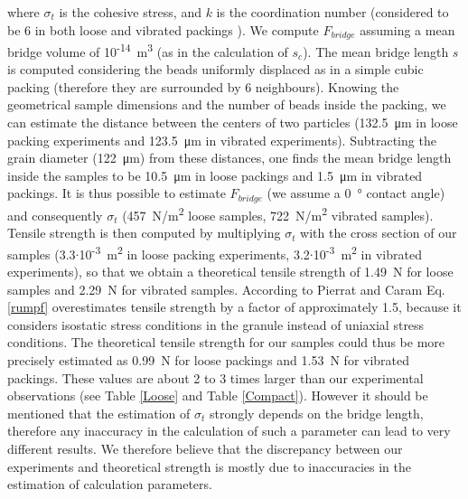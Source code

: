 where $\sigma_t$ is the cohesive stress, and $k$ is the coordination number (considered to be 6 in both loose and vibrated packings \cite{Kohonen2004}). We compute $F_{bridge}$ assuming a mean bridge volume of 10\textsuperscript{-14}~\si{m^3} (as in the calculation of $s_c$). The mean bridge length $s$ is computed considering the beads uniformly displaced as in a simple cubic packing (therefore they are surrounded by 6 neighbours). Knowing the geometrical sample dimensions and the number of beads inside the packing, we can estimate the distance between the centers of two particles (132.5~\si{\micro\metre} in loose packing experiments and 123.5~\si{\micro\metre} in vibrated experiments). Subtracting the grain diameter (122~\si{\micro\metre}) from these distances, one finds the mean bridge length inside the samples to be 10.5~\si{\micro\metre} in loose packings and 1.5~\si{\micro\metre} in vibrated packings. It is thus possible to estimate $F_{bridge}$ (we assume a 0~\si{\degree} contact angle) and consequently $\sigma_t$ (457~\si{N/m^2} loose samples, 722~\si{N/m^2} vibrated samples). Tensile strength is then computed by multiplying $\sigma_t$ with the cross section of our samples (3.3$\cdot$10\textsuperscript{-3}~\si{m^2} in loose packing experiments, 3.2$\cdot$10\textsuperscript{-3}~\si{m^2} in vibrated experiments), so that we obtain a theoretical tensile strength of 1.49~\si{N} for loose samples and 2.29~\si{N} for vibrated samples. According to Pierrat and Caram \cite{Pierrat1997} Eq. \eqref{rumpf} overestimates tensile strength by a factor of approximately 1.5, because it considers isostatic stress conditions in the granule instead of uniaxial stress conditions. The theoretical tensile strength for our samples could thus be more precisely estimated as 0.99~\si{N} for loose packings and 1.53~\si{N} for vibrated packings. These values are about 2 to 3 times larger than our experimental observations (see Table \ref{Loose} and Table \ref{Compact}). However it should be mentioned that the estimation of $\sigma_t$ strongly depends on the bridge length, therefore any inaccuracy in the calculation of such a parameter can lead to very different results. We therefore believe that the discrepancy between our experiments and theoretical strength is mostly due to inaccuracies in the estimation of calculation parameters.

